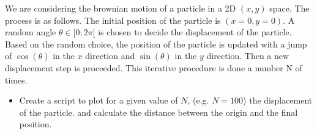 \bexo


We are considering the brownian motion of a particle in a 2D $(x,y)$ space. The process is as follows. The initial position of the particle is $(x=0,y=0)$. A random angle $\theta\in [0;2\pi[$ is chosen to decide the displacement of the particle. Based on the random choice, the position of the particle is updated with a jump of $\cos(\theta)$ in the $x$ direction and $\sin(\theta)$ in the $y$ direction. Then a new displacement step is proceeded. This iterative procedure is done a number N of times. \\


\begin{itemize}
	\item Create a script to plot for a given value of $N$, (e.g. $N=100$) the displacement of the particle. and calculate the distance between the origin and the final position.
\end{itemize}



\eexo
\solution{
}
